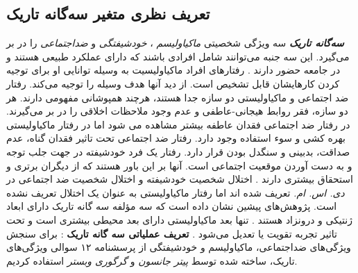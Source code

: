 \subsection{تعریف نظری متغیر سه‌گانه تاریک}
\textit{
    \textbf{
        سه‌گانه تاریک
    }
}
سه ویژگی شخصیتی
\textit{
    ماکیاولیسم
}
\!،
\textit{
    خودشیفتگی
}
و
\textit{
    ضداجتماعی
}
را در بر می‌گیرد. این سه جنبه می‌توانند شامل افرادی باشند که دارای عملکرد طبیعی هستند و در جامعه حضور دارند
\!\citep{paulhusDarkTriadPersonality2002}
\!.
رفتارهای افراد ماکیاولیسیت به وسیله توانایی او برای توجیه کردن
کارهایشان قابل تشخیص است. از دید آنها هدف وسیله را توجیه
می‌کند. رفتار ضد اجتماعی و ماکیاولیستی دو سازه جدا هستند، هرچند همپوشانی
مفهومی دارند. هر دو سازه، فقر روابط هیجانی-عاطفی و عدم وجود
ملاحظات اخلاقی را در بر می‌گیرند. در رفتار ضد اجتماعی فقدان عاطفه
بیشتر مشاهده می شود
\!\citep{paulhusDarkTriadPersonality2002,vernonBehavioralGeneticInvestigation2008}
اما در رفتار ماکیاولیستی بهره کشی و سوء استفاده وجود دارد.
رفتار ضد اجتماعی تحت تاثیر فقدان گناه، عدم صداقت، بدبینی و
سنگدل بودن قرار دارد.
رفتار یک فرد خودشیفته  در جهت جلب توجه و به دست آوردن موقعیت
اجتماعی است. آنها بر این باور هستند که از دیگران برتری و استحقاق بیشتری دارند
\!. اختلال شخصیت خودشیفته و اختلال شخصیت ضد اجتماعی در
\textit{
    دی. اس. ام.
}
\!\!
تعریف شده اند اما رفتار ماکیاولیستی به
عنوان یک اختلال تعریف نشده است. پژوهش‌های پیشین نشان داده است که سه
مؤلفه سه گانه تاریک دارای ابعاد ژنتیکی و درونزاد هستند
\!\citep{kvTraitEmotionalIntelligence2011}
\!.
تنها بعد ماکیاولیستی دارای بعد محیطی بیشتری است و تحت تاثیر تجربه تقویت یا تعدیل می‌شود
\!.
\textbf{تعریف عملیاتی سه گانه تاریک}
:
برای سنجش ویژگی‌های ضداجتماعی، ماکیاولیسم و خودشیفتگی از پرسشنامه ۱۲ سوالی ویژگی‌های تاریک، ساخته شده توسط
\textit{
    پیتر جانسون }
و
\textit{
    گرگوری وبستر}
استفاده کردیم.
